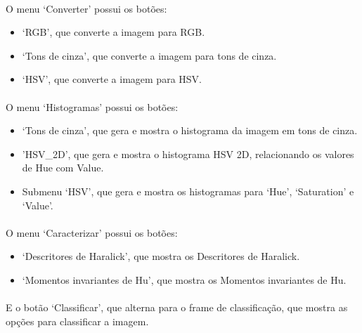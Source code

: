 \documentclass[12pt]{article}
\begin{document}
\paragraph{}O menu ‘Converter’ possui os botões:

\begin{itemize}
    \item ‘RGB’, que converte a imagem para RGB.
    
    \item ‘Tons de cinza’, que converte a imagem para tons de cinza.
    
    \item ‘HSV’, que converte a imagem para HSV.
\end{itemize}

\paragraph{}O menu ‘Histogramas’ possui os botões:

\begin{itemize}
    \item ‘Tons de cinza’, que gera e mostra o histograma da imagem em tons de cinza.

    \item 'HSV\_2D', que gera e mostra o histograma HSV 2D, relacionando os valores de Hue com Value.

    \item Submenu ‘HSV’, que gera e mostra os histogramas para ‘Hue’, ‘Saturation’ e ‘Value’.
\end{itemize}

\paragraph{}O menu ‘Caracterizar’ possui os botões:

\begin{itemize}
    \item ‘Descritores de Haralick’, que mostra os Descritores de Haralick.

    \item ‘Momentos invariantes de Hu’, que mostra os Momentos invariantes de Hu.
\end{itemize}

\paragraph{}E o botão ‘Classificar’, que alterna para o frame de classificação, que mostra as opções para classificar a imagem.
\end{document}
